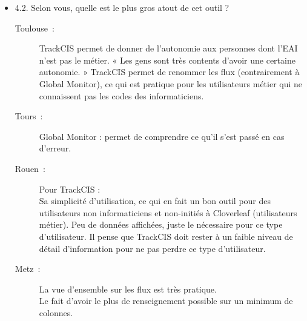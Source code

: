 \begin{itemize}
	  \item 4.2. Selon vous, quelle est le plus gros atout de cet outil ?
	  \begin{description}
	  	\item[Toulouse~:] TrackCIS permet de donner de l’autonomie aux personnes dont
	  	l’EAI n’est pas le métier. « Les gens sont très contents d’avoir une
	  	certaine autonomie. » TrackCIS permet de renommer les flux (contrairement à
	  	Global Monitor), ce qui est pratique pour les utilisateurs métier qui ne
	  	connaissent pas les codes des informaticiens.
	  	\item[Tours~:] Global Monitor : permet de comprendre ce qu’il s’est passé en
	  	cas d’erreur.
	  	\item[Rouen~:] Pour TrackCIS : \\
		Sa simplicité d’utilisation, ce qui en fait un bon outil pour des utilisateurs
		non informaticiens et non-initiés à Cloverleaf (utilisateurs métier). Peu de
		données affichées, juste le nécessaire pour ce type d’utilisateur. Il
		pense que TrackCIS doit rester à un faible niveau de détail d’information
		pour ne pas perdre ce type d’utilisateur.
	  	\item[Metz~:] La vue d’ensemble sur les flux est très pratique.\\
		Le fait d’avoir le plus de renseignement possible sur un minimum de colonnes.
	  \end{description}
	  

\end{itemize}
